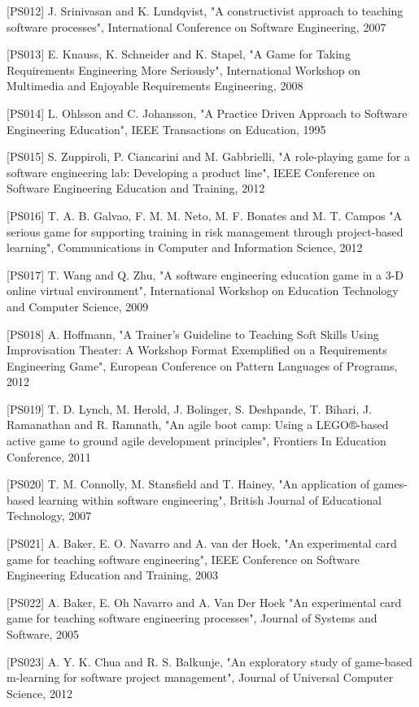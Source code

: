 [PS012]	J. Srinivasan and K. Lundqvist, "A constructivist approach to teaching software processes", International Conference on Software Engineering, 2007

[PS013]	E. Knauss, K. Schneider and K. Stapel, "A Game for Taking Requirements Engineering More Seriously", International Workshop on Multimedia and Enjoyable Requirements Engineering, 2008

[PS014]	L. Ohlsson and C. Johansson, "A Practice Driven Approach to Software Engineering Education", IEEE Transactions on Education, 1995

[PS015]	S. Zuppiroli, P. Ciancarini and M. Gabbrielli, "A role-playing game for a software engineering lab: Developing a product line", IEEE Conference on Software Engineering Education and Training, 2012

[PS016]	T. A. B. Galvao, F. M. M. Neto, M. F. Bonates and M. T. Campos "A serious game for supporting training in risk management through project-based learning", Communications in Computer and Information Science, 2012

[PS017]	T. Wang and Q. Zhu, "A software engineering education game in a 3-D online virtual environment", International Workshop on Education Technology and Computer Science, 2009

[PS018]	A. Hoffmann, "A Trainer's Guideline to Teaching Soft Skills Using Improvisation Theater: A Workshop Format Exemplified on a Requirements Engineering Game", European Conference on Pattern Languages of Programs, 2012

[PS019]	T. D. Lynch, M. Herold, J. Bolinger, S. Deshpande, T. Bihari, J. Ramanathan and R. Ramnath, "An agile boot camp: Using a LEGO®-based active game to ground agile development principles", Frontiers In Education Conference, 2011

[PS020]	T. M. Connolly, M. Stansfield and T. Hainey, "An application of games-based learning within software engineering", British Journal of Educational Technology, 2007

[PS021] 	A. Baker, E. O. Navarro and A. van der Hoek, "An experimental card game for teaching software engineering", IEEE Conference on Software Engineering Education and Training, 2003

[PS022] 	A. Baker, E. Oh Navarro and A. Van Der Hoek "An experimental card game for teaching software engineering processes", Journal of Systems and Software, 2005

[PS023]	A. Y. K. Chua and R. S. Balkunje, "An exploratory study of game-based m-learning for software project management", Journal of Universal Computer Science, 2012


